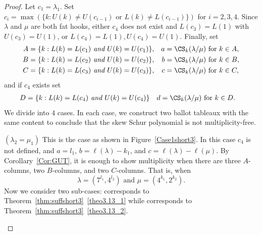 \begin{proof}
Let $c_1 = \lambda_1$. Set $c_i = \max(\{k : U(k) \neq U(c_{i-1})\text{ or }L(k) \neq L(c_{i-1})\})$ for $i=2,3,4$. Since $\lambda$ and $\mu$ are both fat hooks, either $c_4$ does not exist and $L(c_3)=L(1)$ with $U(c_3)=U(1)$, or $L(c_4)=L(1),U(c_4)=U(1)$. Finally, set
\begin{align*}
A & = \{ k : L(k) = L(c_1)\emph{ and }U(k) = U(c_1) \}, & a & = \CS _k(\lambda / \mu)\text{ for }k \in A, \\
B & = \{ k : L(k) = L(c_2)\emph{ and }U(k) = U(c_2) \}, & b & = \CS _k(\lambda / \mu)\text{ for }k \in B, \\
C & = \{ k : L(k) = L(c_3)\emph{ and }U(k) = U(c_3) \}, & c & = \CS _k(\lambda / \mu)\text{ for }k \in C,
\end{align*}
and if $c_4$ exists set
\begin{align*}
D & = \{ k : L(k) = L(c_4)\emph{ and }U(k) = U(c_4) \} & d & = \CS _k(\lambda / \mu)\text{ for }k \in D.
\end{align*}
We divide into $4$ cases. In each case, we construct two ballot tableaux with the same content to conclude that the skew Schur polynomial is not multiplicity-free.

\begin{Case}
{ $(\lambda_2 = \mu_1)$} This is the case as shown in Figure~\ref{Case1short3}. In this case $c_4$ is not defined, and $a = l_1$, $b = \ell(\lambda)-k_1$, and $c = \ell(\lambda)-\ell(\mu)$. By Corollary~\ref{Cor:GUT}, it is enough to show multiplicity when there are three $A$-columns, two $B$-columns, and two $C$-columns. That is, when 
\[
\lambda = (7^{l_1}, 4^{l_2})\text{ and }\mu=(4^{k_1},2^{k_2}).
\] 
Now we consider two sub-cases:  corresponds to Theorem~\ref{thm:suffshort3}~\ref{theo3.13_1} while  corresponds to Theorem~\ref{thm:suffshort3}~\ref{theo3.13_2}.

\begin{figure}[htb]\centering
\end{figure}
\end{Case}
\end{proof}
